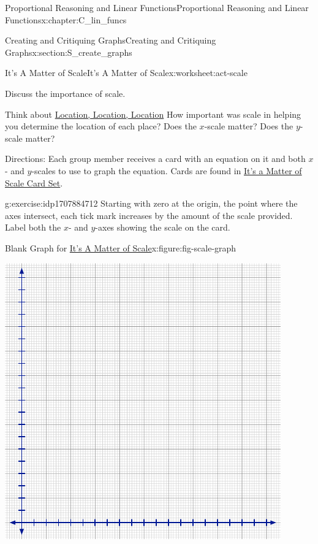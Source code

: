 \documentclass[oneside,10pt,]{book}
\numberwithin{equation}{chapter}
\begin{document}
\begin{chapterptx}{Proportional Reasoning and Linear Functions}{}{Proportional Reasoning and Linear Functions}{}{}{x:chapter:C_lin_funcs}
\begin{sectionptx}{Creating and Critiquing Graphs}{}{Creating and Critiquing Graphs}{}{}{x:section:S_create_graphs}
\begin{worksheet-subsection}{It's A Matter of Scale}{}{It's A Matter of Scale}{}{}{x:worksheet:act-scale}
\begin{introduction}{}
\begin{itemize}[label=\textbullet]
\end{itemize}
Discuss the importance of scale.%
\par
Think about \hyperref[x:worksheet:act-location]{Location, Location, Location} How important was scale in helping you determine the location of each place? Does the \(x\)-scale matter? Does the \(y\)-scale matter?%
\par
Directions: Each group member receives a card with an equation on it and both \(x\)- and \(y\)-scales to use to graph the equation. Cards are found in \hyperref[x:worksheet:scale-cards]{It's a Matter of Scale Card Set}.%
\end{introduction}%
\begin{divisionexercise}{1}{}{}{g:exercise:idp1707884712}%
Starting with zero at the origin, the point where the axes intersect, each tick mark increases by the amount of the scale provided. Label both the \(x\)- and \(y\)-axes showing the scale on the card.%
\begin{figureptx}{Blank Graph for \hyperref[x:worksheet:act-scale]{It's A Matter of Scale}}{x:figure:fig-scale-graph}{}%
\begin{image}{0.15}{0.7}{0.15}%
\includegraphics[width=\linewidth]{external/blank-graph.pdf}
\end{image}%
\tcblower
\end{figureptx}%

\end{divisionexercise}
\end{worksheet-subsection}
\end{sectionptx}
\end{chapterptx}
\end{document}
